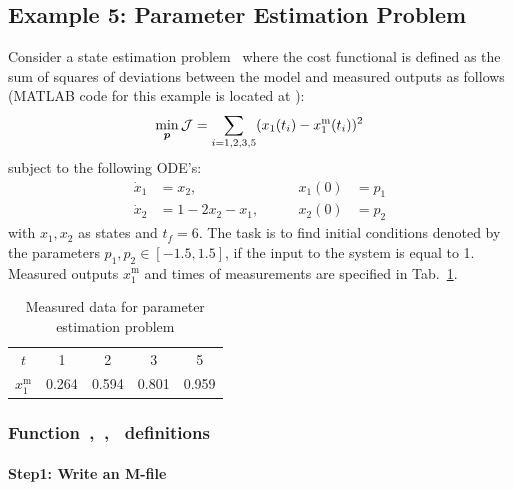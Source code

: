 \subsection{Example 5: Parameter Estimation Problem}
\label{sec:pep}

Consider a state estimation problem~\cite{fik02} where the cost
functional is defined as the sum of squares of deviations between the
model and measured outputs as follows (MATLAB code for this example is
located at ):
\begin{equation}
\min_{\ve{p}} \mf{J} =
\sum_{i=1,2,3,5}(x_{1}(t_{i})-x_{1}^{\text{m}}(t_{i}))^{2}
\label{eq:pep}  
\end{equation}
subject to the following ODE's:
\begin{align}
\dot{x}_{1} &= x_{2}, &\qquad x_{1}(0) &= p_{1} \\
\dot{x}_{2} &= 1 - 2x_{2} - x_{1}, &\qquad x_{2}(0) &= p_{2}
\end{align} with $x_{1}, x_{2}$ as states and $t_f = 6$.
The task is to find initial conditions denoted by the parameters
$p_{1}, p_{2} \in [-1.5,1.5]$, if the input to the system is equal to
1. Measured outputs $x_{1}^{\text{m}}$ and times of measurements are
specified in Tab.~\ref{tab:measureddatas}.  

\begin{table}[h]
  \begin{center}
    \begin{tabular}{|c|c|c|c|c|}
      \hline
      $t$ & 1 & 2 & 3 & 5\\
      $x_{1}^{\text{m}}$ & 0.264 & 0.594 & 0.801 & 0.959\\
      \hline
    \end{tabular}
  \end{center}
  \caption{Measured data for parameter estimation problem}
  \label{tab:measureddatas} 
\end{table}
 
\subsubsection{Function~,~,~  definitions}

\paragraph{Step1: Write an M-file }

{\small }

